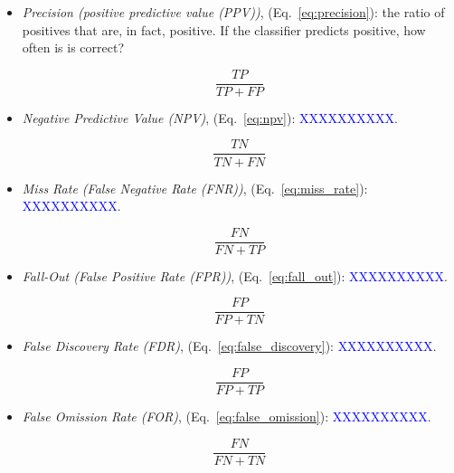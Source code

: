 \begin{itemize}
\item \textit{Precision (positive predictive value (PPV))}, (Eq.~\ref{eq:precision}): the ratio of positives that are, in fact, positive. If the classifier predicts positive, how often is is correct?

\begin{equation}
{\frac{TP}{TP+FP}}
\label{eq:precision}
\end{equation}

\item \textit{Negative Predictive Value (NPV)}, (Eq.~\ref{eq:npv}): \textcolor{blue}{XXXXXXXXXX}.

\begin{equation}
{\frac{TN}{TN+FN}}
\label{eq:npv}
\end{equation}

\item \textit{Miss Rate (False Negative Rate (FNR))}, (Eq.~\ref{eq:miss_rate}): \textcolor{blue}{XXXXXXXXXX}.

\begin{equation}
{\frac{FN}{FN+TP}}
\label{eq:miss_rate}
\end{equation}

\item \textit{Fall-Out (False Positive Rate (FPR))}, (Eq.~\ref{eq:fall_out}): \textcolor{blue}{XXXXXXXXXX}.

\begin{equation}
{\frac{FP}{FP+TN}}
\label{eq:fall_out}
\end{equation}

\item \textit{False Discovery Rate (FDR)}, (Eq.~\ref{eq:false_discovery}): \textcolor{blue}{XXXXXXXXXX}.

\begin{equation}
{\frac{FP}{FP+TP}}
\label{eq:false_discovery}
\end{equation}

\item \textit{False Omission Rate (FOR)}, (Eq.~\ref{eq:false_omission}): \textcolor{blue}{XXXXXXXXXX}.

\begin{equation}
{\frac{FN}{FN+TN}}
\label{eq:false_omission}
\end{equation}


\end{itemize}
